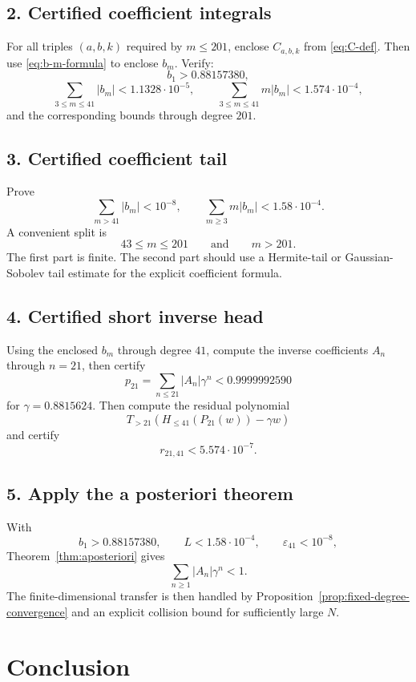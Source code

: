 \documentclass[11pt]{article}
\newcommand{\1}{\mathbf{1}}
\newcommand{\eps}{\varepsilon}
\newcommand{\abs}[1]{\left\lvert #1\right\rvert}
\begin{document}
\subsection*{2. Certified coefficient integrals}
For all triples \((a,b,k)\) required by \(m\le201\), enclose \(C_{a,b,k}\) from \eqref{eq:C-def}.  Then use \eqref{eq:b-m-formula} to enclose \(b_m\).  Verify:
\[
        b_1>0.88157380,
\]
\[
        \sum_{3\le m\le41}\abs{b_m}<1.1328\cdot10^{-5},
        \qquad
        \sum_{3\le m\le41}m\abs{b_m}<1.574\cdot10^{-4},
\]
and the corresponding bounds through degree \(201\).

\subsection*{3. Certified coefficient tail}
Prove
\[
        \sum_{m>41}\abs{b_m}<10^{-8},
        \qquad
        \sum_{m\ge3}m\abs{b_m}<1.58\cdot10^{-4}.
\]
A convenient split is
\[
        43\le m\le201
        \qquad\text{and}\qquad
        m>201.
\]
The first part is finite.  The second part should use a Hermite-tail or Gaussian-Sobolev tail estimate for the explicit coefficient formula.

\subsection*{4. Certified short inverse head}
Using the enclosed \(b_m\) through degree \(41\), compute the inverse coefficients \(A_n\) through \(n=21\), then certify
\[
        p_{21}=\sum_{n\le21}\abs{A_n}\gamma^n<0.9999992590
\]
for \(\gamma=0.8815624\).  Then compute the residual polynomial
\[
        T_{>21}\left(H_{\le41}(P_{21}(w))-\gamma w\right)
\]
and certify
\[
        r_{21,41}<5.574\cdot10^{-7}.
\]

\subsection*{5. Apply the a posteriori theorem}
With
\[
        b_1>0.88157380,
        \qquad
        L<1.58\cdot10^{-4},
        \qquad
        \eps_{41}<10^{-8},
\]
Theorem~\ref{thm:aposteriori} gives
\[
        \sum_{n\ge1}\abs{A_n}\gamma^n<1.
\]
The finite-dimensional transfer is then handled by Proposition~\ref{prop:fixed-degree-convergence} and an explicit collision bound for sufficiently large \(N\).

\section{Conclusion}
\end{document}

